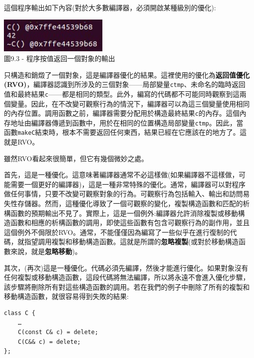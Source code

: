 這個程序輸出如下內容(對於大多數編譯器，必須開啟某種級別的優化):

\begin{center}
\includegraphics[width=0.4\textwidth]{content/3/chapter9/images/3.jpg}\\
圖9.3 - 程序按值返回一個對象的輸出
\end{center}

只構造和銷燬了一個對象，這是編譯器優化的結果。這裡使用的優化為\textbf{返回值優化(RVO)}，編譯器認識到所涉及的三個對象——局部變量\texttt{ctmp}、未命名的臨時返回值和最終結果\texttt{c}——都是相同的類型。此外，編寫的代碼都不可能同時觀察到這兩個變量。因此，在不改變可觀察行為的情況下，編譯器可以為這三個變量使用相同的內存位置。調用函數之前，編譯器需要分配用於構造最終結果\texttt{c}的內存。這個內存地址由編譯器傳遞到函數中，用於在相同的位置構造局部變量\texttt{ctmp}。因此，當函數\texttt{makeC}結束時，根本不需要返回任何東西，結果已經在它應該在的地方了。這就是RVO。

雖然RVO看起來很簡單，但它有幾個微妙之處。 

首先，這是一種優化。這意味著編譯器通常不必這樣做(如果編譯器不這樣做，可能需要一個更好的編譯器)，這是一種非常特殊的優化。通常，編譯器可以對程序做任何事情，只要不改變可觀察對象的行為。可觀察行為包括輸入、輸出和訪問易失性存儲器。然而，這種優化導致了一個可觀察的變化，複製構造函數和匹配的析構函數的預期輸出不見了。實際上，這是一個例外:編譯器允許消除複製或移動構造函數和相應的析構函數的調用，即使這些函數有包含可觀察行為的副作用，並且這個例外不侷限於RVO。通常，不能僅僅因為編寫了一些似乎在進行復制的代碼，就指望調用複製和移動構造函數。這就是所謂的\textbf{忽略複製}(或對於移動構造函數來說，就是\textbf{忽略移動})。

其次，(再次)這是一種優化。代碼必須先編譯，然後才能進行優化。如果對象沒有任何複製或移動構造函數，這段代碼將無法編譯，所以將永遠不會進入優化步驟，該步驟將刪除所有對這些構造函數的調用。若在我們的例子中刪除了所有的複製和移動構造函數，就很容易得到失敗的結果:

\begin{lstlisting}[style=styleCXX]
class C {
	…
	C(const C& c) = delete;
	C(C&& c) = delete;
}; 
\end{lstlisting}

